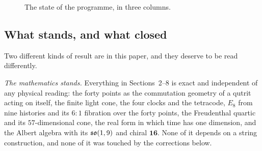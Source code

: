 \begin{figure}[htbp]
\caption{The state of the programme, in three columns.}
\label{fig:state}
\end{figure}

\subsection{What stands, and what closed}

Two different kinds of result are in this paper, and they deserve to be read differently.

\emph{The mathematics stands.} Everything in Sections~2--8 is exact and independent of any physical
reading: the forty points as the commutation geometry of a qutrit acting on itself, the finite light
cone, the four clocks and the tetracode, $E_8$ from nine histories and its $6{:}1$ fibration over the
forty points, the Freudenthal quartic and its $57$-dimensional cone, the real form in which time has one
dimension, and the Albert algebra with its $\mathfrak{so}(1,9)$ and chiral $\mathbf{16}$. None of it depends on a
string construction, and none of it was touched by the corrections below.

